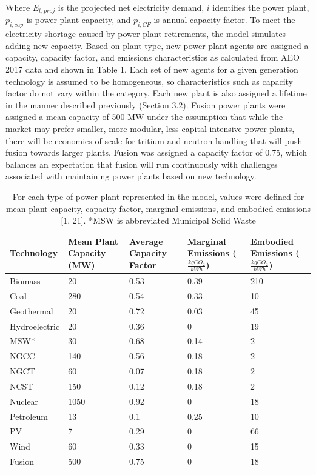 \documentclass[review]{elsarticle}
\begin{document}
Where $E_{t,proj}$ is the projected net electricity demand, $i$ identifies the power plant, $p_{i,cap}$ is power plant capacity, and $p_{i,CF}$ is annual capacity factor. To meet the electricity shortage caused by power plant retirements, the model simulates adding new capacity. Based on plant type, new power plant agents are assigned a capacity, capacity factor, and emissions characteristics as calculated from AEO 2017 data and shown in Table 1. Each set of new agents for a given generation technology is assumed to be homogeneous, so characteristics such as capacity factor do not vary within the category. Each new plant is also assigned a lifetime in the manner described previously (Section 3.2). Fusion power plants were assigned a mean capacity of 500 MW under the assumption that while the market may prefer smaller, more modular, less capital-intensive power plants, there will be economies of scale for tritium and neutron handling that will push fusion towards larger plants. Fusion was assigned a capacity factor of 0.75, which balances an expectation that fusion will run continuously with challenges associated with maintaining power plants based on new technology.

\begin{table}[!htbp]
	\centering
	\scriptsize
	\caption{For each type of power plant represented in the model, values were defined for mean plant capacity, capacity factor, marginal emissions, and embodied emissions [1, 21].  *MSW is abbreviated Municipal Solid Waste}
	\label{tab_embod}
	\begin{tabular}{lllll}

Technology & Mean Plant Capacity (MW) & Average Capacity Factor & Marginal Emissions ($\frac{kg CO_2}{kWh}$) & Embodied Emissions ($\frac{kg CO_2}{kWh}$) \\ \hline \hline
Biomass &20 & 0.53 & 0.39 & 210 \\ 
Coal & 280 & 0.54 & 0.33 & 10\\
Geothermal & 20 & 0.72 & 0.03 & 45\\
Hydroelectric & 20 & 0.36& 0 & 19 \\
MSW* & 30& 0.68 & 0.14 & 2 \\
NGCC & 140 & 0.56 & 0.18 & 2 \\
NGCT & 60 & 0.07 & 0.18 & 2 \\
NCST & 150 & 0.12 & 0.18 & 2 \\
Nuclear & 1050 & 0.92 & 0 &  18\\
Petroleum & 13 & 0.1 & 0.25 & 10\\
PV & 7 & 0.29 & 0 & 66\\
Wind &  60 & 0.33 & 0 & 15 \\
Fusion & 500 & 0.75 & 0 & 18\\\hline
	\end{tabular}
\end{table}
\end{document}
